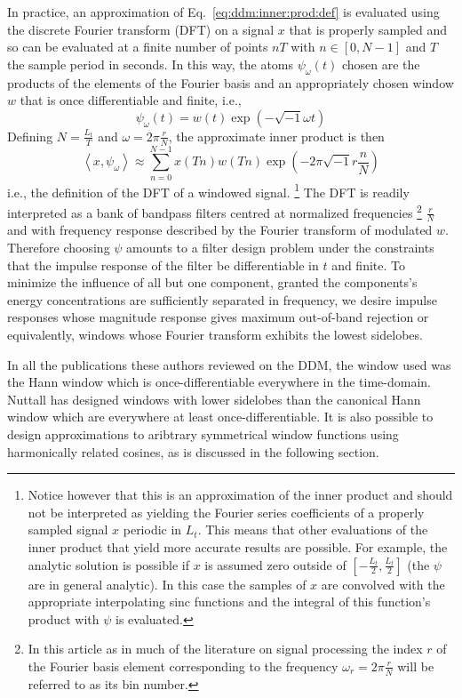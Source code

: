 \documentclass[twoside,a4paper]{article}
\begin{document}
In practice, an approximation of Eq.~\ref{eq:ddm:inner:prod:def} is evaluated using
the discrete Fourier transform (DFT) on a signal $x$ that is properly sampled
and so can be evaluated at a finite number of points $nT$ with $n \in [0,N-1]$ and
$T$ the sample period in seconds. In this way, the atoms $\psi_{\omega}(t)$ chosen
are the products of the elements of the Fourier basis and an appropriately
chosen window $w$ that is once differentiable and finite, i.e.,
%
\[
    \psi_{\omega}(t) = w(t) \exp(-\sqrt{-1} \omega t)
\]
%
Defining $N = \frac{L_{t}}{T}$ and $\omega = 2
\pi \frac{r}{N}$, the approximate
inner product is then
%
\[
    \left\langle x , \psi_{\omega} \right\rangle \approx 
    \sum_{n=0}^{N-1} x(Tn) w(Tn) \exp(-2 \pi \sqrt{-1} r \frac{n}{N}) 
\]
%
i.e., the definition of the DFT of a windowed signal.%
\footnote{%
    Notice however that this is an approximation of the inner product and should
    not be interpreted as yielding the Fourier series coefficients of a properly
    sampled signal $x$ periodic in $L_{t}$. This means that other
    evaluations of the inner product that yield more accurate results are
    possible. For example, the analytic solution is possible if $x$ is assumed
    zero outside of $[-\frac{L_{t}}{2},\frac{L_{t}}{2}]$ (the $\psi$ are in
    general analytic).  In this case the samples of $x$ are convolved with the
    appropriate interpolating sinc functions and the integral of this function's
    product with $\psi$ is evaluated.
}%
The DFT is readily interpreted as a bank of bandpass filters centred at
normalized frequencies%
\footnote{%
In this article as in much of the literature on signal processing the index $r$
of the Fourier basis element corresponding to the frequency $\omega_{r} = 2 \pi
\frac{r}{N}$ will be referred to as its bin number.
}
$\frac{r}{N}$ and with frequency response described by
the Fourier transform of modulated $w$. Therefore choosing $\psi$ amounts to a
filter design problem under the constraints that the impulse response of the
filter be differentiable in $t$ and finite. To minimize the influence of
all but one component, granted the components's energy concentrations are
sufficiently separated in frequency, we desire impulse responses whose magnitude
response gives maximum
out-of-band rejection or equivalently, windows whose Fourier transform exhibits
the lowest sidelobes.

In all the publications these authors reviewed on the DDM, the window used was
the Hann window which is once-differentiable everywhere in the time-domain.
Nuttall \cite{nuttall1981some} has designed windows with lower sidelobes than the canonical Hann
window which are everywhere at least once-differentiable. It is also possible to
design approximations to aribtrary symmetrical window functions using
harmonically related cosines, as is discussed in the following section.
\end{document}
